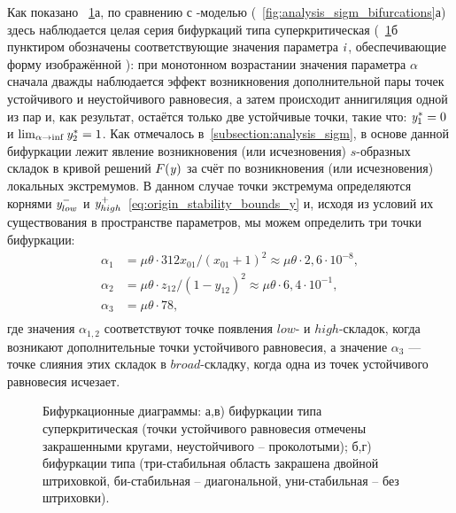 Как показано \onfigure~\ref{fig:analysis_origin_bifurcations}а, по сравнению с -моделью (\seefigure~\ref{fig:analysis_sigm_bifurcations}а) здесь наблюдается целая серия бифуркаций типа суперкритическая  (\onfigure~\ref{fig:analysis_origin_bifurcations}б пунктиром обозначены соответствующие значения параметра $\mathit{i}$, обеспечивающие форму изображённой ): при монотонном возрастании значения параметра $\alpha$ сначала дважды наблюдается эффект возникновения дополнительной пары точек устойчивого и неустойчивого равновесия, а затем происходит аннигиляция одной из пар и, как результат, остаётся только две устойчивые точки, такие что: $\mathit{y}^{*}_{1} = 0$ и $\lim_{\alpha \to \inf} \mathit{y}^{*}_{2} = 1$. Как отмечалось в~\autoref{subsection:analysis_sigm}, в основе данной бифуркации лежит явление возникновения (или исчезновения) $s$-образных складок в кривой решений $F(\mathit{y})$ за счёт по возникновения (или исчезновения) локальных экстремумов. В данном случае точки экстремума определяются корнями $\mathit{y}^{-}_{low}$ и $\mathit{y}^{+}_{high}$~\eqref{eq:origin_stability_bounds_y} и, исходя из условий их существования в пространстве параметров, мы можем определить три точки бифуркации:
\begin{equation}
    \label{eq:origin_bifurcation_alpha}
    \begin{aligned}
        \alpha_{1} &= \mu \theta \cdot 312 x_{01} / (x_{01} + 1)^2 \approx \mu \theta \cdot 2,6 \cdot 10^{-8}, \\
        \alpha_{2} &= \mu \theta \cdot z_{12} / (1 - y_{12})^2 \approx \mu \theta \cdot 6,4 \cdot 10^{-1}, \\
        \alpha_{3} &= \mu \theta \cdot 78,\\
    \end{aligned}
\end{equation}
где значения $\alpha_{1,2}$ соответствуют точке появления $low$- и $high$-складок, когда возникают дополнительные точки устойчивого равновесия, а значение $\alpha_{3}$ --- точке слияния этих складок в $broad$-складку, когда одна из точек устойчивого равновесия исчезает.

\begin{figure}[t]
    \caption{Бифуркационные диаграммы: а,в) бифуркации типа суперкритическая  (точки устойчивого равновесия отмечены закрашенными кругами, неустойчивого -- проколотыми); б,г) бифуркации типа  (три-стабильная область закрашена двойной штриховкой, би-стабильная -- диагональной, уни-стабильная -- без штриховки).}
    \label{fig:analysis_origin_bifurcations}
\end{figure}

